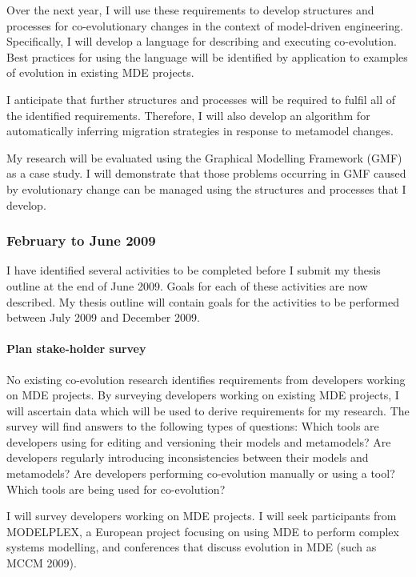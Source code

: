 Over the next year, I will use these requirements to develop structures and processes for co-evolutionary changes in the context of model-driven engineering. Specifically, I will develop a language for describing and executing co-evolution. Best practices for using the language will be identified by application to examples of evolution in existing MDE projects.

I anticipate that further structures and processes will be required to fulfil all of the identified requirements. Therefore, I will also develop an algorithm for automatically inferring migration strategies in response to metamodel changes.

My research will be evaluated using the Graphical Modelling Framework (GMF) \cite{gronback06gmf} as a case study. I will demonstrate that those problems occurring in GMF caused by evolutionary change can be managed using the structures and processes that I develop.

\subsubsection{February to June 2009}
I have identified several activities to be completed before I submit my thesis outline at the end of June 2009. Goals for each of these activities are now described. My thesis outline will contain goals for the activities to be performed between July 2009 and December 2009.

\paragraph{Plan stake-holder survey} %
\label{par:plan_stakeholder_survey}
No existing co-evolution research identifies requirements from developers working on MDE projects. By surveying developers working on existing MDE projects, I will ascertain data which will be used to derive requirements for my research. The survey will find answers to the following types of questions: Which tools are developers using for editing and versioning their models and metamodels? Are developers regularly introducing inconsistencies between their models and metamodels? Are developers performing co-evolution manually or using a tool? Which tools are being used for co-evolution?

I will survey developers working on MDE projects. I will seek participants from MODELPLEX, a European project focusing on using MDE to perform complex systems modelling, and conferences that discuss evolution in MDE (such as MCCM 2009). 

